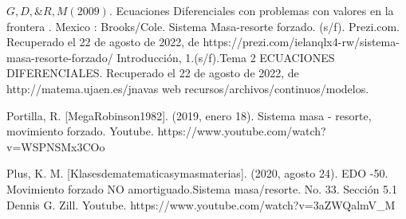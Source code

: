 \documentclass[12pt,a4paper]{article}
\begin{document}
	
	\begin{thebibliography}{10}
	 $G, D, \& R, M (2009)$. Ecuaciones Diferenciales con problemas con valores en la frontera . Mexico : Brooks/Cole.
	 Sistema Masa-resorte forzado. (s/f). Prezi.com. Recuperado el 22 de agosto de 2022, de  https://prezi.com/ielanqlx4-rw/sistema-masa-resorte-forzado/
	 Introducción, 1.(s/f).Tema 2 ECUACIONES DIFERENCIALES. Recuperado el 22 de agosto de 2022, de http://matema.ujaen.es/jnavas web recursos/archivos/continuos/modelos.

 Portilla, R. [MegaRobinson1982]. (2019, enero 18). Sistema masa - resorte, movimiento forzado. Youtube. https://www.youtube.com/watch?v=WSPNSMx3COo

 Plus, K. M. [Klasesdematematicasymasmaterias]. (2020, agosto 24). EDO -50. Movimiento forzado NO amortiguado.Sistema masa/resorte. No. 33. Sección  5.1 Dennis G. Zill. Youtube. https://www.youtube.com/watch?v=3aZWQalmV\_M


	
	
	\end{thebibliography}
	
\end{document}
